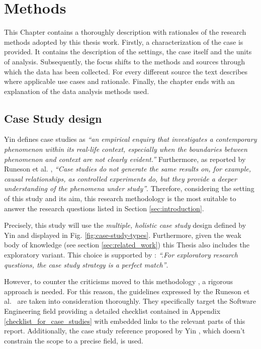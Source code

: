\chapter{Methods} \label{methods}
This Chapter contains a thoroughly description with rationales of the research methods adopted by this thesis work. Firstly, a characterization of the case is provided. It contains the description of the settings, the case itself and the units of analysis. Subsequently, the focus shifts to the methods and sources through which the data has been collected. For every different source the text describes where applicable use cases and rationale. Finally, the chapter ends with an explanation of the data analysis methods used.


%
%
%
%
\section{Case Study design}	\label{sec:case-description}
Yin \cite{case_study_guide} defines case studies as \textit{``an empirical enquiry that investigates a contemporary phenomenon within its real-life context, especially when the boundaries between phenomenon and context are not clearly evident.''}
Furthermore, as reported by Runeson et al. \cite[p.~3]{case_study_software_engineering}, \textit{``Case studies do not generate the same results on, for example, causal relationships, as controlled experiments do, but they provide a deeper understanding of the phenomena under study''}. Therefore, considering the setting of this study and its aim, this research methodology is the most suitable to answer the research questions listed in Section \ref{sec:introduction}.

Precisely, this study will use the \textit{multiple, holistic case study} design defined by Yin \cite{case_study_guide} and displayed in Fig. \ref{fig:case-study-types}. Furthermore, given the weak body of knowledge (see section \ref{sec:related_work}) this Thesis also includes the exploratory variant. This choice is supported by \cite[p.~19]{case_study_software_engineering}: \textit{``.For exploratory research questions, the case study strategy is a perfect match''}.

However, to counter the criticisms moved to this methodology \cite[p.~4]{case_study_software_engineering}, a rigorous approach is needed. For this reason, the guidelines expressed by the Runeson et al.\ \cite{case_study_software_engineering} are taken into consideration thoroughly. They specifically target the Software Engineering field providing a detailed checklist contained in Appendix \ref{checklist_for_case_studies} with embedded links to the relevant parts of this report. Additionally, the case study reference proposed by Yin \cite{case_study_guide}, which doesn't constrain the scope to a precise field, is used.


